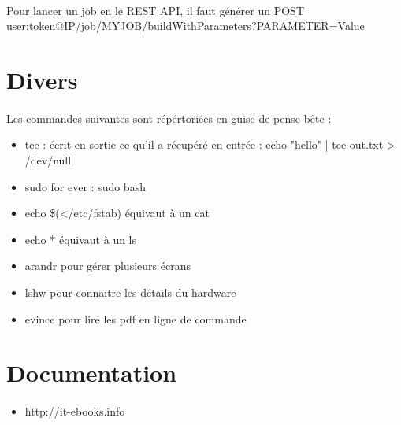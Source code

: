\documentclass{article}
\begin{document}
\paragraph{}
Pour lancer un job en le REST API, il faut générer un POST user:token@IP/job/MYJOB/buildWithParameters?PARAMETER=Value

\section{Divers}\label{divers}
\paragraph{}
Les commandes suivantes sont répértoriées en guise de pense bête :
\begin{itemize}
  \item tee : écrit en sortie ce qu'il a récupéré en entrée : echo "hello" | tee out.txt > /dev/null
  \item sudo for ever : sudo bash
  \item echo \$(</etc/fstab) équivaut à un cat
  \item echo * équivaut à un ls
  \item arandr pour gérer plusieurs écrans
  \item lshw pour connaitre les détails du hardware
  \item evince pour lire les pdf en ligne de commande
\end{itemize}

\section{Documentation}\label{documentation}
\paragraph{}
\begin{itemize}
  \item http://it-ebooks.info
\end{itemize}
\end{document}
